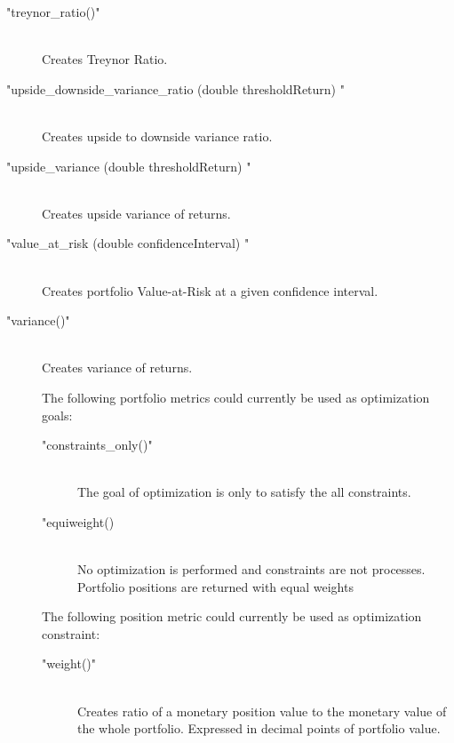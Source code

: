 \documentclass[letterpaper]{report}
\newcounter{N}
\begin{document}
\begin{description}
\item["treynor\_ratio()"] \hfill \\ 
Creates Treynor Ratio.

\item["upside\_downside\_variance\_ratio (double thresholdReturn) "] \hfill \\ 
Creates upside to downside variance ratio.

\item["upside\_variance (double thresholdReturn) "] \hfill \\ 
Creates upside variance of returns.


\item["value\_at\_risk (double confidenceInterval) "] \hfill \\ 
Creates portfolio Value-at-Risk at a given confidence interval.

\item["variance()"] \hfill \\ 
Creates variance of  returns.



	

The following portfolio metrics could currently be used as optimization goals: 

\begin{description}

\item["constraints\_only()"] \hfill \\ 
The goal of optimization is only to satisfy the all constraints.

\item["equiweight()] \hfill \\  
No optimization is performed and constraints are not processes.
Portfolio positions are returned with equal weights

\end{description}

The following position metric could currently be used as optimization constraint: 
\begin{description}

\item["weight()"] \hfill \\ 
Creates ratio of a monetary position value to the monetary value of the
whole portfolio. Expressed in decimal points of portfolio value.
\end{description}

\end{description}
\end{document}
